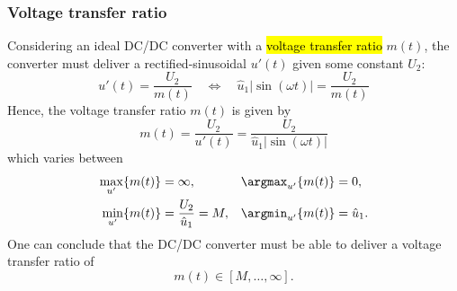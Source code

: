 \begin{frame}
    \frametitle{Voltage transfer ratio} 
    Considering an ideal DC/DC converter with a \hl{voltage transfer ratio} $m(t)$, the converter must deliver a rectified-sinusoidal $u'(t)$ given some constant $U_2$:
    \begin{equation}
        u'(t) = \frac{U_2}{m(t)} \quad \Leftrightarrow \quad \hat{u}_1|\sin(\omega t)| = \frac{U_2}{m(t)}
    \end{equation}
    Hence, the voltage transfer ratio $m(t)$ is given by
    \begin{equation}
        m(t) = \frac{U_2}{u'(t)}=\frac{U_2}{\hat{u}_1|\sin(\omega t)|} 
    \end{equation}
    which varies between
    \begin{equation}
        \begin{alignedat}{2}
            \max_{u'}\{m(t)\} &= \infty, \quad &&\argmax_{u'}\{m(t)\} = 0,\\
            \min_{u'}\{m(t)\} &= \frac{U_2}{\hat{u}_1}=M, \quad &&\argmin_{u'}\{m(t)\} = \hat{u}_1.
        \end{alignedat}
    \end{equation}
    One can conclude that the DC/DC converter must be able to deliver a voltage transfer ratio of 
    $$
     m(t)\in[M,\ldots,\infty].
    $$
\end{frame}

